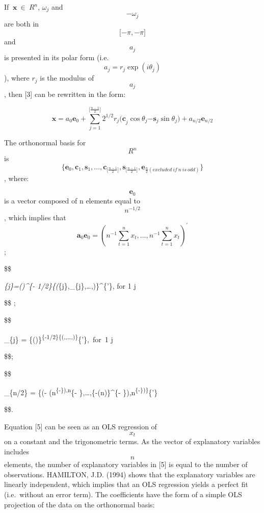\documentclass[
  letterpaper,
  DIV=11,
  numbers=noendperiod]{scrreprt}
\begin{document}
If \(\ \mathbf{x\  \in}\ {R}^{n}\), \(\omega_{j}\) and \[{-\omega}_{j}\]
are both in \[\lbrack- \pi, -\pi \rbrack\] and \[a_{j}\] is presented in
its polar form (i.e.\[a_{j} = r_{j}\exp( i\theta_{j})\]), where
\(r_{j}\) is the modulus of \[a_{j}\], then {[}3{]} can be rewritten in
the form:

\[
 \mathbf{x} = a_{0}\mathbf{e}_{0} + \sum_{j = 1}^{\lbrack\frac{n - 1}{2}\rbrack}{ {2^{1/2}r}_{j}{(\mathbf{c}}_{j}\cos\theta_{j}{- \mathbf{s}}_{j}\sin\theta_{j}) + a_{n/2}\mathbf{e}_{n/2}}
 \]

The orthonormal basis for \[{R}^{n}\] is
\[\{\mathbf{e}_{0},\mathbf{c}_{1},\mathbf{s}_{1},\ldots,\mathbf{c}_{\lbrack\frac{n - 1}{2}\rbrack},\mathbf{s}_{\lbrack\frac{n - 1}{2}\rbrack},\mathbf{e}_{\frac{n}{2}(excluded\ if\ n\ is\ odd)}\}
\], where:

\[\mathbf{e}_{0}\] is a vector composed of n elements equal to
\[n^{- 1/2}\], which implies that
\[\mathbf{a}_{0}\mathbf{e}_{0} = {(n^{-1}\sum_{t = 1}^{n}x_{t},\ldots,n^{- 1}\sum_{t=1}^{n}x_{t})}^{'}\];

\$\$

\emph{\{j\}=()\^{}\{-
1/2\}\{(\cos\omega}\{j\},\cos{2\omega}\_\{j\},\ldots,)\}\^{}\{'\},
for 1 \leq j \leq \lbrack {}\rbrack

\$\$ ;

\$\$

\_\{j\} =
\{()\}\textsuperscript{\{-1/2\}\{(,,\ldots,)\}}\{'\},~for~1
\leq j \leq \lbrack {} \rbrack

\$\$;

\$\$

\_\{n/2\} = \{(- (n\textsuperscript{\{-\}),n}\{-
\},\ldots,\{-(n)\}\^{}\{-
\}),n\textsuperscript{\{-\})\}}\{'\}

\$\$.

Equation {[}5{]} can be seen as an OLS regression of \[x_{t}\] on a
constant and the trigonometric terms. As the vector of explanatory
variables includes \[n\] elements, the number of explanatory variables
in {[}5{]} is equal to the number of observations. HAMILTON, J.D. (1994)
shows that the explanatory variables are linearly independent, which
implies that an OLS regression yields a perfect fit (i.e.~without an
error term). The coefficients have the form of a simple OLS projection
of the data on the orthonormal basis:
\end{document}
